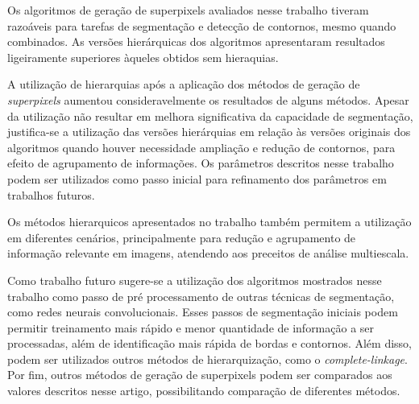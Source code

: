 \begin{document}
Os algoritmos de geração de superpixels avaliados nesse trabalho tiveram razoáveis para tarefas de segmentação e detecção de contornos, mesmo quando combinados. As versões hierárquicas dos algoritmos apresentaram resultados ligeiramente superiores àqueles obtidos sem hieraquias.

A utilização de hierarquias após a aplicação dos métodos de geração de \textit{superpixels} aumentou consideravelmente os resultados de alguns métodos. Apesar da utilização não resultar em melhora significativa da capacidade de segmentação, justifica-se a utilização das versões hierárquias em relação às versões originais dos algoritmos quando houver necessidade ampliação e redução de contornos, para efeito de agrupamento de informações. Os parâmetros descritos nesse trabalho podem ser utilizados como passo inicial para refinamento dos parâmetros em trabalhos futuros.

Os métodos hierarquicos apresentados no trabalho também permitem a utilização em diferentes cenários, principalmente para redução e agrupamento de informação relevante em imagens, atendendo aos preceitos de análise multiescala. 

Como trabalho futuro sugere-se a utilização dos algoritmos mostrados nesse trabalho como passo de pré processamento de outras técnicas de segmentação, como redes neurais convolucionais. Esses passos de segmentação iniciais podem permitir treinamento mais rápido e menor quantidade de informação a ser processadas, além de identificação mais rápida de bordas e contornos. Além disso, podem ser utilizados outros métodos de hierarquização, como o \textit{complete-linkage}. Por fim, outros métodos de geração de superpixels podem ser comparados aos valores descritos nesse artigo, possibilitando comparação de diferentes métodos.




\end{document}
